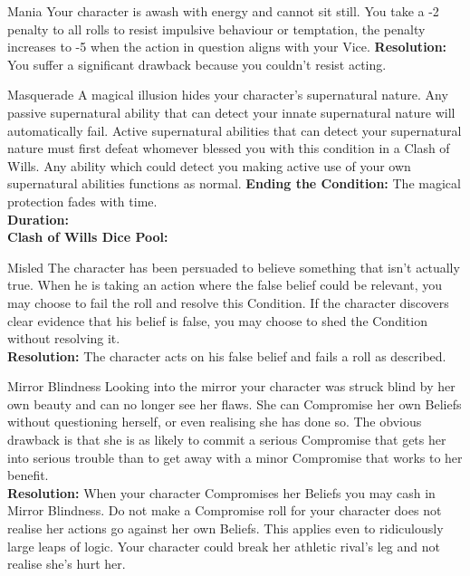 \documentclass[10pt, frontgrid, backgrid]{flacards}
\begin{document}
\Cond
{Mania}
{Your character is awash with energy and cannot sit still. You take a -2 penalty to all rolls to resist impulsive behaviour or temptation, the penalty increases to -5 when the action in question aligns with your Vice. 
\textbf{Resolution:} You suffer a significant drawback because you couldn't resist acting.}


\BCond
{Masquerade}
{A magical illusion hides your character's supernatural nature. Any passive supernatural ability that can detect your innate supernatural nature  will automatically fail. Active supernatural abilities that can detect your supernatural nature must first defeat whomever blessed you with this condition in a Clash of Wills. Any ability which could detect you making active use of your own supernatural abilities functions as normal.
\textbf{Ending the Condition:} The magical protection fades with time.\\
\textbf{Duration:} \fillunderline \\
\textbf{Clash of Wills Dice Pool:} \fillunderline}

\Cond
{Misled}
{The character has been persuaded to believe something that isn’t actually true. When he is taking an action where the false belief could be relevant, you may choose to fail the roll and resolve this Condition. If the character discovers clear evidence that his belief is false, you may choose to shed the Condition without resolving it. \\
\textbf{Resolution:} The character acts on his false belief and fails a roll as described.}

\Cond
{Mirror Blindness}
{Looking into the mirror your character was struck blind by her own beauty and can no longer see her flaws. She can Compromise her own Beliefs without questioning herself, or even realising she has done so. The obvious drawback is that she is as likely to commit a serious Compromise that gets her into serious trouble than to get away with a minor Compromise that works to her benefit. \\
\textbf{Resolution:} When your character Compromises her Beliefs you may cash in Mirror Blindness. Do not make a Compromise roll for your character does not realise her actions go against her own Beliefs. This applies even to ridiculously large leaps of logic. Your character could break her athletic rival's leg and not realise she's hurt her.}

\end{document}
